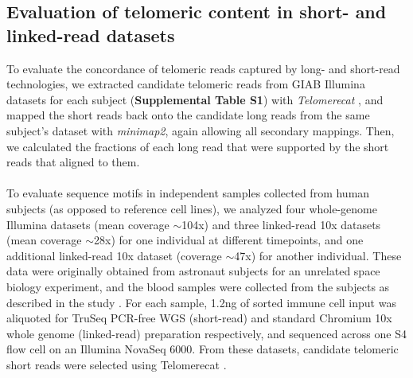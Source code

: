 \documentclass{article}
\begin{document}
\subsection*{Evaluation of telomeric content in short- and linked-read datasets}
    To evaluate the concordance of telomeric reads captured by long- and short-read technologies,
        we extracted candidate telomeric reads from GIAB Illumina datasets for each subject (\textbf{Supplemental Table S1})
            with \textit{Telomerecat} \parencite{telomerecat},
            and mapped the short reads back onto the candidate long reads from the same subject's dataset with \textit{minimap2},
            again allowing all secondary mappings.
        Then, we calculated the fractions of each long read that were supported by the short reads that aligned to them.
    \\~\\
    To evaluate sequence motifs in independent samples collected from human subjects (as opposed to reference cell lines),
        we analyzed four whole-genome Illumina datasets (mean coverage $\sim$104x)
        and three linked-read 10x datasets (mean coverage $\sim$28x) for one individual at different timepoints,
        and one additional linked-read 10x dataset (coverage $\sim$47x) for another individual.
    These data were originally obtained from astronaut subjects for an unrelated space biology experiment,
        and the blood samples were collected from the subjects as described in the study \parencite{twins_study}.
        For each sample, 1.2ng of sorted immune cell input was aliquoted for
            TruSeq PCR-free WGS (short-read) and standard Chromium 10x whole genome (linked-read) preparation respectively,
            and sequenced across one S4 flow cell on an Illumina NovaSeq 6000.
    From these datasets, candidate telomeric short reads were selected using Telomerecat \parencite{telomerecat}.
\end{document}
